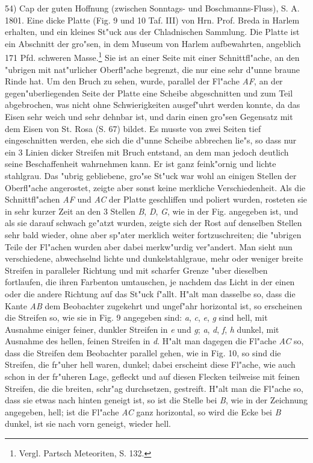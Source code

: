 \documentclass[a4paper, 11pt, oneside, german]{article}
\begin{document}
54) Cap der guten Hoffnung (zwischen Sonntags- und Boschmanns-Fluss), S. A. 1801. Eine dicke Platte (Fig. 9 und 10 Taf. III) von Hrn. Prof. Breda in Harlem erhalten, und ein kleines St"uck aus der Chladnischen Sammlung. Die Platte ist ein Abschnitt der gro"sen, in dem Museum von Harlem aufbewahrten, angeblich 171 Pfd. schweren Masse.\footnote{Vergl. Partsch Meteoriten, S. 132.} Sie ist an einer Seite mit einer Schnittfl"ache, an den "ubrigen mit nat"urlicher Oberfl"ache begrenzt, die nur eine sehr d"unne braune Rinde hat. Um den Bruch zu sehen, wurde, parallel der Fl"ache \emph{AF}, an der gegen"uberliegenden Seite der Platte eine Scheibe abgeschnitten und zum Teil abgebrochen, was nicht ohne Schwierigkeiten ausgef"uhrt werden konnte, da das Eisen sehr weich und sehr dehnbar ist, und darin einen gro"sen Gegensatz mit dem Eisen von St. Rosa (S. 67) bildet. Es musste von zwei Seiten tief eingeschnitten werden, ehe sich die d"unne Scheibe abbrechen lie"s, so dass nur ein 3 Linien dicker Streifen mit Bruch entstand, an dem man jedoch deutlich seine Beschaffenheit wahrnehmen kann. Er ist ganz feink"ornig und lichte stahlgrau. Das "ubrig gebliebene, gro"se St"uck war wohl an einigen Stellen der Oberfl"ache angerostet, zeigte aber sonst keine merkliche Verschiedenheit. Als die Schnittfl"achen \emph{AF} und \emph{AC} der Platte geschliffen und poliert wurden, rosteten sie in sehr kurzer Zeit an den 3 Stellen \emph{B}, \emph{D}, \emph{G}, wie in der Fig. angegeben ist, und als sie darauf schwach ge"atzt wurden, zeigte sich der Rost auf denselben Stellen sehr bald wieder, ohne aber sp"ater merklich weiter fortzuschreiten; die "ubrigen Teile der Fl"achen wurden aber dabei merkw"urdig ver"andert. Man sieht nun verschiedene, abwechselnd lichte und dunkelstahlgraue, mehr oder weniger breite Streifen in paralleler Richtung und mit scharfer Grenze "uber dieselben fortlaufen, die ihren Farbenton umtauschen, je nachdem das Licht in der einen oder die andere Richtung auf das St"uck f"allt. H"alt man dasselbe so, dass die Kante \emph{AB} dem Beobachter zugekehrt und ungef"ahr horizontal ist, so erscheinen die Streifen so, wie sie in Fig. 9 angegeben sind: \emph{a}, \emph{c}, \emph{e}, \emph{g} sind hell, mit Ausnahme einiger feiner, dunkler Streifen in \emph{e} und \emph{g}; \emph{a}, \emph{d}, \emph{f}, \emph{h} dunkel, mit Ausnahme des hellen, feinen Streifen in \emph{d}. H"alt man dagegen die Fl"ache \emph{AC} so, dass die Streifen dem Beobachter parallel gehen, wie in Fig. 10, so sind die Streifen, die fr"uher hell waren, dunkel; dabei erscheint diese Fl"ache, wie auch schon in der fr"uheren Lage, gefleckt und auf diesen Flecken teilweise mit feinen Streifen, die die breiten, schr"ag durchsetzen, gestreift. H"alt man die Fl"ache so, dass sie etwas nach hinten geneigt ist, so ist die Stelle bei \emph{B}, wie in der Zeichnung angegeben, hell; ist die Fl"ache \emph{AC} ganz horizontal, so wird die Ecke bei \emph{B} dunkel, ist sie nach vorn geneigt, wieder hell.
\end{document}
